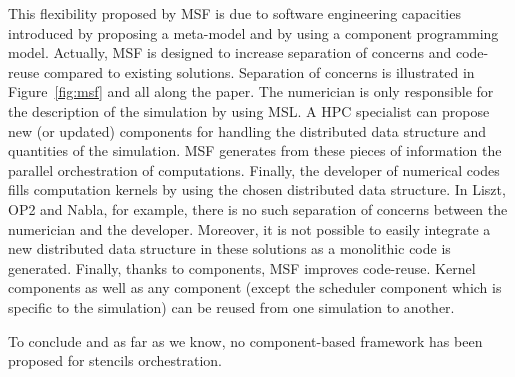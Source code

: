 This flexibility proposed by MSF is due to software engineering capacities introduced by proposing a meta-model and by using a component programming model. Actually, MSF is designed to increase separation of concerns and code-reuse compared to existing solutions.
Separation of concerns is illustrated in Figure~\ref{fig:msf} and all along the paper. The numerician is only responsible for the description of the simulation by using MSL. A HPC specialist can propose new (or updated) components for handling the distributed data structure and quantities of the simulation. MSF generates from these pieces of information the parallel orchestration of computations. Finally, the developer of numerical codes fills computation kernels by using the chosen distributed data structure. In Liszt, OP2 and Nabla, for example, there is no such separation of concerns between the numerician and the developer. 
Moreover, it is not possible to easily integrate a new distributed data structure in these solutions as a monolithic code is generated.
Finally, thanks to components, MSF improves code-reuse. Kernel components as well as any component (except the scheduler component which is specific to the simulation) can be reused from one simulation to another.

To conclude and as far as we know, no component-based framework has been proposed for stencils orchestration.
